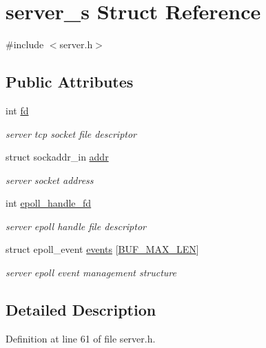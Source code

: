 \hypertarget{structserver__s}{\section{server\-\_\-s Struct Reference}
\label{structserver__s}
}


{\ttfamily \#include $<$server.\-h$>$}

\subsection*{Public Attributes}
\begin{DoxyCompactItemize}
\item 
int \hyperlink{structserver__s_a6129acbc6b313f77efeb488754f559ec}{fd}
\begin{DoxyCompactList}\small\item\em server tcp socket file descriptor \end{DoxyCompactList}\item 
struct sockaddr\-\_\-in \hyperlink{structserver__s_a09fe17ff633d4d26a4080d46749c1fe3}{addr}
\begin{DoxyCompactList}\small\item\em server socket address \end{DoxyCompactList}\item 
int \hyperlink{structserver__s_a86019c8230bc00f711bb8276a07442f0}{epoll\-\_\-handle\-\_\-fd}
\begin{DoxyCompactList}\small\item\em server epoll handle file descriptor \end{DoxyCompactList}\item 
struct epoll\-\_\-event \hyperlink{structserver__s_a9095f17d03e5eb5c4e99092cbec45eed}{events} \mbox{[}\hyperlink{client_8h_aae114cdd7784a59af222f175dac6312b}{B\-U\-F\-\_\-\-M\-A\-X\-\_\-\-L\-E\-N}\mbox{]}
\begin{DoxyCompactList}\small\item\em server epoll event management structure \end{DoxyCompactList}\end{DoxyCompactItemize}


\subsection{Detailed Description}


Definition at line 61 of file server.\-h.



